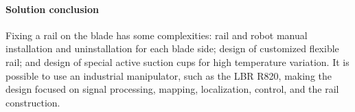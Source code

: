 



\paragraph{Solution conclusion}

Fixing a rail on the blade has some complexities: rail and robot manual
installation and uninstallation for each blade side; design of customized
flexible rail; and design of special active suction cups for high temperature
variation. It is possible to use an industrial manipulator, such as the
LBR R820, making the design focused on signal processing,
mapping, localization, control, and the rail construction. 

